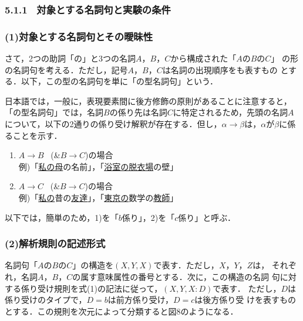 \subsubsection{5.1.1 \ 対象とする名詞句と実験の条件}
\subsubsection*{(1)対象とする名詞句とその曖昧性}

さて，2つの助詞「の」と3つの名詞$A，B，C$から構成された「$AのBのC$」
の形の名詞句を考える．ただし，記号$A，B，C$は名詞の出現順序をも表すもの
とする．以下，この型の名詞句を単に「の型名詞句」という．

日本語では，一般に，表現要素間に後方修飾の原則があることに注意すると，
「の型名詞句」では，名詞$B$の係り先は名詞$C$に特定されるため，先頭の名詞$A$
について，以下の2通りの係り受け解釈が存在する．但し，$\alpha \rightarrow
\beta$は，$\alpha$が$\beta$に係ることを示す．\vspace{\baselineskip}

\renewcommand{\labelenumi}{}
\begin{enumerate}
 \item $A \rightarrow B$ \ (\&$B \rightarrow C$)の場合\\
       例)「\underline{私の母}の名前」，「\underline{浴室の脱衣場}の壁」
 \item $A \rightarrow C$ \ (\&$B \rightarrow C$)の場合\\
       例)「\underline{私の}昔の\underline{友達}」，「\underline{東京の}数学の\underline{教師}」
\end{enumerate}

以下では，簡単のため，1)を「$b$係り」，2)を「$c$係り」と呼ぶ．
\subsubsection*{(2)解析規則の記述形式}

名詞句「$AのBのC$」の構造を$(X,Y,X)$で表す．ただし，$X，Y，Z$は，
それぞれ，名詞$A，B，C$の属す意味属性の番号とする．次に，この構造の名詞
句に対する係り受け規則を式(1)の記法に従って，$(X,Y,X:D)$で表す．
ただし，$D$は係り受けのタイプで，$D=b$は前方係り受け，$D=c$は後方係り受
けを表すものとする．この規則を次元によって分類すると図8のようになる．


